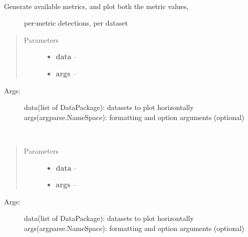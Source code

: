 \documentclass[letterpaper,10pt,english]{sphinxmanual}
\begin{document}
\begin{fulllineitems}
\label{index:bounos.run_metric_comparison}~\begin{description}
\item[{Generate available metrics, and plot both the metric values,}] \leavevmode
per-metric detections, per dataset

\end{description}
\begin{quote}\begin{description}
\item[{Parameters}] \leavevmode\begin{itemize}
\item {} 
\textbf{data} -- 

\item {} 
\textbf{args} -- 

\end{itemize}

\end{description}\end{quote}
\begin{description}
\item[{Args:}] \leavevmode
data(list of DataPackage): datasets to plot horizontally
args(argparse.NameSpace): formatting and option arguments (optional)

\end{description}

\end{fulllineitems}


\begin{fulllineitems}
\label{index:bounos.run_overlay}~\begin{quote}\begin{description}
\item[{Parameters}] \leavevmode\begin{itemize}
\item {} 
\textbf{data} -- 

\item {} 
\textbf{args} -- 

\end{itemize}

\end{description}\end{quote}
\begin{description}
\item[{Args:}] \leavevmode
data(list of DataPackage): datasets to plot horizontally
args(argparse.NameSpace): formatting and option arguments (optional)

\end{description}

\end{fulllineitems}
\end{document}
